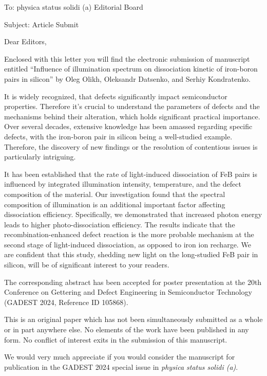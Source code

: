 \documentclass[preprint]{elsarticle}
\begin{document}
To:
physica status solidi (a) Editorial Board


Subject:
Article Submit

\vspace{5mm}
Dear Editors,

\vspace{3mm}
Enclosed with this letter you will find the electronic submission of manuscript entitled
``Influence of illumination spectrum on dissociation kinetic of iron-boron pairs in silicon''
by Oleg Olikh, Oleksandr Datsenko, and Serhiy Kondratenko.


It is widely recognized, that defects significantly impact semiconductor properties.
Therefore it's crucial to understand the parameters of defects and the mechanisms behind their alteration,
which holds significant practical importance.
Over several decades, extensive knowledge has been amassed regarding specific defects,
with the iron-boron pair in silicon being a well-studied example.
Therefore, the discovery of new findings or the resolution of contentious issues is particularly intriguing.

It has been established that the rate of light-induced dissociation of FeB pairs is influenced by integrated illumination intensity,
temperature, and the defect composition of the material.
Our investigation found that the spectral composition of illumination is an additional important factor
affecting dissociation efficiency.
Specifically, we demonstrated that increased photon energy leads to higher photo-dissociation efficiency.
The results indicate that the recombination-enhanced defect reaction is the more probable mechanism
at the second stage of light-induced dissociation, as opposed to iron ion recharge.
We are confident that this study, shedding new light on the long-studied FeB pair in silicon, will be of significant interest to your readers.



The corresponding abstract has been accepted for poster presentation at the 20th Conference on
Gettering and Defect Engineering in Semiconductor Technology (GADEST 2024, Reference ID 105868).

This is an original paper which has not been simultaneously submitted as a whole or in part anywhere else.
No elements of the work have been published in any form.
No conflict of interest exits in the submission of this manuscript.


We would  very much appreciate if you would consider the manuscript for publication in the GADEST 2024 special issue in \emph{physica status solidi (a)}.
\end{document}
